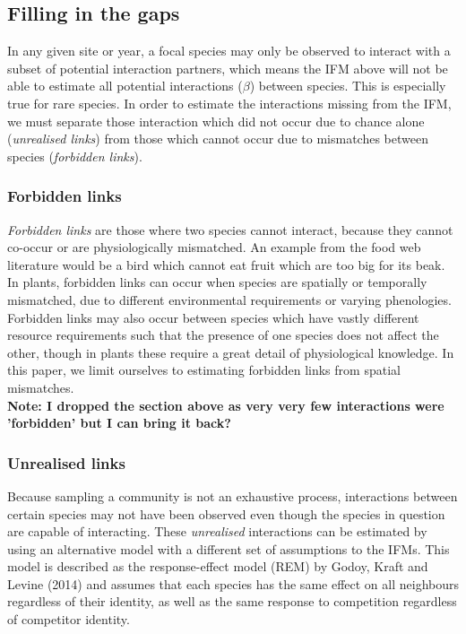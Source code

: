 \documentclass[a4,12pt]{article}
\begin{document}
        
        \subsection{Filling in the gaps}
        
        In any given site or year, a focal species may only be observed to interact with a subset of potential interaction partners, which means the IFM above will not be able to estimate all potential interactions ($\beta$) between species. This is especially true for rare species. In order to estimate the interactions missing from the IFM, we must separate those interaction which did not occur due to chance alone (\textit{unrealised links}) from those which cannot occur due to mismatches between species (\textit{forbidden links}). 
        
        \subsubsection{Forbidden links}
        
        \textit{Forbidden links} are those where two species cannot interact, because they cannot co-occur or are physiologically mismatched. An example from the food web literature would be a bird which cannot eat fruit which are too big for its beak. In plants, forbidden links can occur when species are spatially or temporally mismatched, due to different environmental requirements or varying phenologies. Forbidden links may also occur between species which have vastly different resource requirements such that the presence of one species does not affect the other, though in plants these require a great detail of physiological knowledge. In this paper, we limit ourselves to estimating forbidden links from spatial mismatches. \\
        
        \textbf{Note: I dropped the section above as very very few interactions were 'forbidden' but I can bring it back?}


        \subsubsection{Unrealised links}
        
        Because sampling a community is not an exhaustive process, interactions between certain species may not have been observed even though the species in question are capable of interacting. These \textit{unrealised} interactions can be estimated by using an alternative model with a different set of assumptions to the IFMs. This model is described as the response-effect model (REM) by Godoy, Kraft and Levine (2014) and assumes that each species has the same effect on all neighbours regardless of their identity, as well as the same response to competition regardless of competitor identity. 
        
\end{document}
